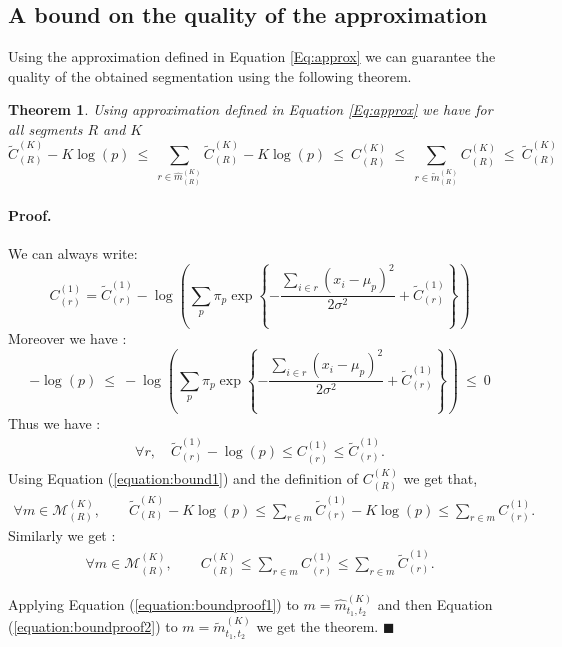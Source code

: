 \documentclass[article,10pt]{llncs}
\newtheorem{theo}{Theorem}[section]    %
\begin{document}
\subsection{A bound on the quality of the approximation }
Using the approximation defined in Equation \ref{Eq:approx} we can guarantee the quality of the obtained segmentation using the following theorem.
\begin{theo}
Using approximation defined in Equation \ref{Eq:approx} we have for all segments $R$ and $K$
$$ \widetilde{C}_{(R)}^{(K)} - K \log(p) 
\ \leq \ 
\underset{r \in \widehat{m}_{(R)}^{(K)}}{\operatorname{\sum}} \widetilde{C}_{(R)}^{(K)} - K \log(p) 
\ \leq \ 
{C}_{(R)}^{(K)} 
\ \leq \ 
\underset{r \in \widetilde{m}_{(R)}^{(K)}}{\operatorname{\sum}} {C}_{(R)}^{(K)} 
\ \leq \ 
\widetilde{C}_{(R)}^{(K)} $$
\label{theo:theoapprox}
\end{theo}

\paragraph{Proof.} 
We can always write:
$$ {C}_{(r)}^{(1)} = \widetilde{C}_{(r)}^{(1)} - \log\left(\sum_p \pi_p \exp \left\{ -\frac{\sum_{i \in r} (x_i - \mu_p)^2 }{ 2 \sigma^2} +\widetilde{C}_{(r)}^{(1)} \right\}\right)$$
Moreover we have :
$$-\log(p) \ \leq \ 
- \log\left(\sum_p \pi_p \exp \left\{ -\frac{\sum_{i \in r} (x_i - \mu_p)^2 }{ 2 \sigma^2} +\widetilde{C}_{(r)}^{(1)} \right\}\right)
\ \leq \  
0$$
Thus we have :
\begin{eqnarray}
\forall r,  \quad \widetilde{C}_{(r)}^{(1)} -\log(p) \leq {C}_{(r)}^{(1)} \leq \widetilde{C}_{(r)}^{(1)} \label{equation:bound1}.
\end{eqnarray}
Using Equation (\ref{equation:bound1}) and the definition of ${C}_{(R)}^{(K)}$ we get that, 
\begin{eqnarray} 
\forall m \in \mathcal{M}^{(K)}_{(R)}, \qquad
\widetilde{C}_{(R)}^{(K)} - K\log(p) \leq \sum_{r \in m} \widetilde{C}_{(r)}^{(1)} - K \log(p) \leq   \sum_{r \in m} {C}_{(r)}^{(1)} .
\label{equation:boundproof1}\end{eqnarray}
Similarly we get :
\begin{eqnarray} 
\forall m \in \mathcal{M}^{(K)}_{(R)}, \qquad
{C}_{(R)}^{(K)} \leq \sum_{r \in m} {C}_{(r)}^{(1)} \leq   \sum_{r \in m} \widetilde{C}_{(r)}^{(1)} .
\label{equation:boundproof2}\end{eqnarray}

Applying Equation (\ref{equation:boundproof1}) to $m = \widehat{m}_{t_1, t_2}^{(K)}$ and then Equation (\ref{equation:boundproof2})
to $m =  \widetilde{m}_{t_1, t_2}^{(K)}$ we get the theorem. $\blacksquare$
\end{document}
